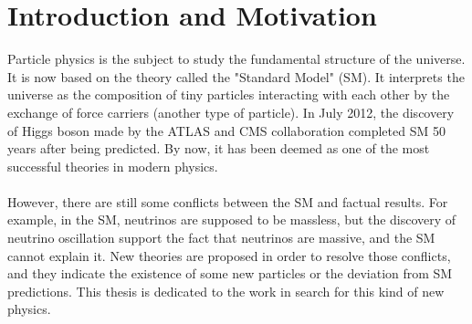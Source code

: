 \chapter{Introduction and Motivation}
Particle physics is the subject to study the fundamental structure of the universe. It is now based on the theory called the "Standard Model" (SM). It interprets the universe as the composition of tiny particles interacting with each other by the exchange of force carriers (another type of particle).  In July 2012, the discovery of Higgs boson made by the ATLAS and CMS collaboration \cite{HIGG-2012-27,CMS-HIG-12-028} completed SM 50 years after being predicted. By now, it has been deemed as one of the most successful theories in modern physics.
\\
\\
However, there are still some conflicts between the SM and factual results. For example, in the SM, neutrinos are supposed to be massless, but the discovery of neutrino oscillation support the fact that neutrinos are massive, and the SM cannot explain it. New theories are proposed in order to resolve those conflicts, and they indicate the existence of some new particles or the deviation from SM predictions. This thesis is dedicated to the work in search for this kind of new physics.

